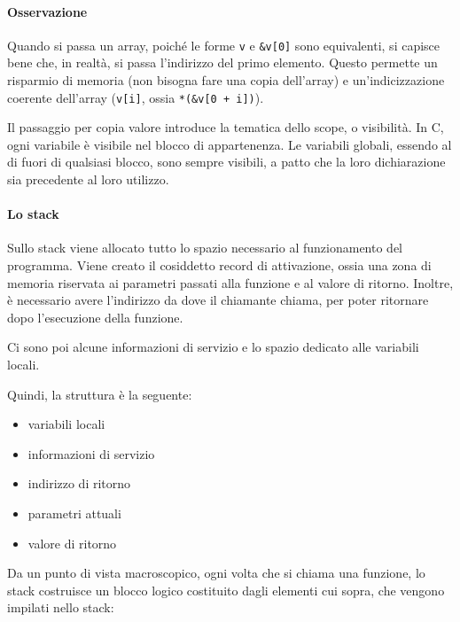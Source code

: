 \paragraph*{Osservazione}
Quando si passa un array, poiché le forme \verb|v| e \verb|&v[0]| sono equivalenti, si capisce bene che, in realtà, si passa l'indirizzo del primo elemento. Questo permette un risparmio di memoria (non bisogna fare una copia dell'array) e un'indicizzazione coerente dell'array (\verb|v[i]|, ossia \verb|*(&v[0 + i])|).

Il passaggio per copia valore introduce la tematica dello scope, o visibilità. In C, ogni variabile è visibile nel blocco di appartenenza. Le variabili globali, essendo al di fuori di qualsiasi blocco, sono sempre visibili, a patto che la loro dichiarazione sia precedente al loro utilizzo.

\paragraph*{Lo stack}

Sullo stack viene allocato tutto lo spazio necessario al funzionamento del programma.
Viene creato il cosiddetto record di attivazione, ossia una zona di memoria riservata ai parametri passati alla funzione e al valore di ritorno.
Inoltre, è necessario avere l'indirizzo da dove il chiamante chiama, per poter ritornare dopo l'esecuzione della funzione.

Ci sono poi alcune informazioni di servizio e lo spazio dedicato alle variabili locali.

Quindi, la struttura è la seguente:
\begin{itemize}
  \item variabili locali
  \item informazioni di servizio
  \item indirizzo di ritorno
  \item parametri attuali
  \item valore di ritorno
\end{itemize}

Da un punto di vista macroscopico, ogni volta che si chiama una funzione, lo stack costruisce un blocco logico costituito dagli elementi cui sopra, che vengono impilati nello stack:


